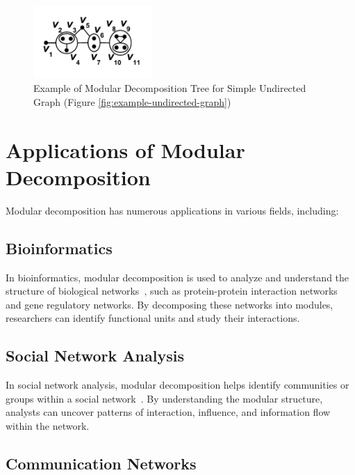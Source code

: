 \begin{figure}[!h]
    \centering
    \includegraphics[width=0.40\textwidth]{images/graphs/undirected_graph_wikipedia_module}
    \caption{Example of Modular Decomposition Tree for Simple Undirected Graph (Figure \ref{fig:example-undirected-graph})}
    \label{fig:example-undirected-graph-module}
\end{figure}


\section{Applications of Modular Decomposition}\label{sec:applications-of-modular-decomposition}

Modular decomposition has numerous applications in various fields, including:

\subsection*{Bioinformatics}\label{subsec:bioinformatics}

In bioinformatics, modular decomposition is used to analyze and understand the structure of biological networks~\cite{MDPPIN}, such as protein-protein interaction networks and gene regulatory networks.
By decomposing these networks into modules, researchers can identify functional units and study their interactions.

\subsection*{Social Network Analysis}\label{subsec:social-network-analysis}

In social network analysis, modular decomposition helps identify communities or groups within a social network~\cite{NCCD}.
By understanding the modular structure, analysts can uncover patterns of interaction, influence, and information flow within the network.

\subsection*{Communication Networks}\label{subsec:communication-networks}

